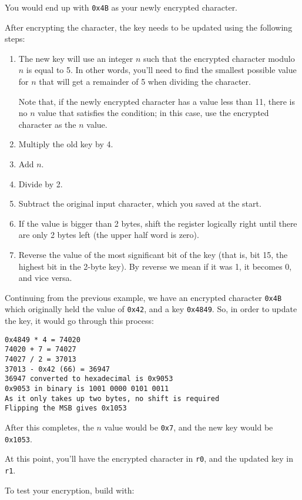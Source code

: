 \documentclass{article}
\def\r#1{\texttt{r#1}}
\begin{document}
You would end up with {\tt 0x4B} as your newly encrypted character.\newline


After encrypting the character, the key needs to be updated using the 
following steps:

\begin{enumerate} \item The new key will use an integer $n$ such that the 
encrypted character modulo $n$ is equal to 5. In other words, you'll need 
to find the smallest possible value for $n$ that will get a remainder of 5 
when dividing the character. 

Note that, if the newly encrypted character has a value less than 11, there
is no $n$ value that satisfies the condition; in this case, use the encrypted
character as the $n$ value.
\item Multiply the old key by 4.
\item Add $n$.
\item Divide by 2.
\item Subtract the original input character, which you saved at the start.
\item If the value is bigger than 2 bytes, shift the register logically 
right until there are only 2 bytes left (the upper half word is zero).
\item Reverse the value of the most significant bit of the key (that is, bit
15, the highest bit in the 2-byte key). By reverse we mean if it was 1, it becomes 
0, and vice versa.
\end{enumerate}

Continuing from the previous example, we have an encrypted character 
{\tt 0x4B} which originally held the value of {\tt 0x42}, and a key 
{\tt 0x4849}. So, in order to update the key, it would go through this 
process:
\begin{verbatim}
0x4849 * 4 = 74020
74020 + 7 = 74027
74027 / 2 = 37013
37013 - 0x42 (66) = 36947
36947 converted to hexadecimal is 0x9053
0x9053 in binary is 1001 0000 0101 0011
As it only takes up two bytes, no shift is required
Flipping the MSB gives 0x1053
\end{verbatim}

After this completes, the $n$ value would be {\tt 0x7}, and the new key 
would be {\tt 0x1053}.


At this point, you'll have the encrypted character in \r{0}, and the updated
key in \r{1}.

To test your encryption, build with:
\end{document}
